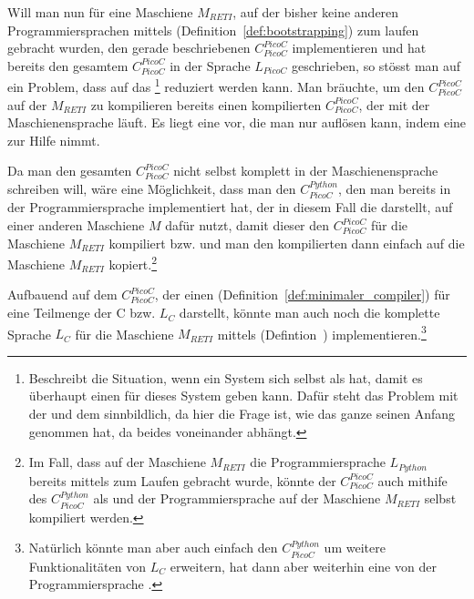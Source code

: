 Will man nun für eine Maschiene $M_{RETI}$, auf der bisher keine anderen Programmiersprachen mittels  (Definition~\ref{def:bootstrapping}) zum laufen gebracht wurden, den gerade beschriebenen  $C_{PicoC}^{PicoC}$ implementieren und hat bereits den gesamtem  $C_{PicoC}^{PicoC}$ in der Sprache  $L_{PicoC}$ geschrieben, so stösst man auf ein Problem, dass auf das \footnote{Beschreibt die Situation, wenn ein System sich selbst als  hat, damit es überhaupt einen  für dieses System geben kann. Dafür steht das Problem mit der  und dem  sinnbildlich, da hier die Frage ist, wie das ganze seinen Anfang genommen hat, da beides  voneinander abhängt.} reduziert werden kann. Man bräuchte, um den  $C_{PicoC}^{PicoC}$ auf der  $M_{RETI}$ zu kompilieren bereits einen kompilierten  $C_{PicoC}^{PicoC}$, der mit der Maschienensprache  läuft. Es liegt eine  vor, die man nur auflösen kann, indem eine  zur Hilfe nimmt.

Da man den gesamten  $C_{PicoC}^{PicoC}$ nicht selbst komplett in der Maschienensprache  schreiben will, wäre eine Möglichkeit, dass man den  $C_{PicoC}^{Python}$, den man bereits in der Programmiersprache  implementiert hat, der in diesem Fall die  darstellt, auf einer anderen Maschiene $M$ dafür nutzt, damit dieser den  $C_{PicoC}^{PicoC}$ für die Maschiene $M_{RETI}$ kompiliert bzw.  und man den kompilierten  dann einfach auf die Maschiene $M_{RETI}$ kopiert.\footnote{Im Fall, dass auf der Maschiene $M_{RETI}$ die Programmiersprache $L_{Python}$ bereits mittels  zum Laufen gebracht wurde, könnte der  $C_{PicoC}^{PicoC}$ auch mithife des  $C_{PicoC}^{Python}$ als  und der Programmiersprache  auf der Maschiene $M_{RETI}$ selbst kompiliert werden.}

Aufbauend auf dem  $C_{PicoC}^{PicoC}$, der einen  (Definition~\ref{def:minimaler_compiler}) für eine Teilmenge der  C bzw. $L_C$ darstellt, könnte man auch noch die komplette Sprache $L_C$ für die Maschiene $M_{RETI}$ mittels  (Defintion~) implementieren.\footnote{Natürlich könnte man aber auch einfach den  $C_{PicoC}^{Python}$ um weitere Funktionalitäten von $L_C$ erweitern, hat dann aber weiterhin eine  von der Programmiersprache .}

